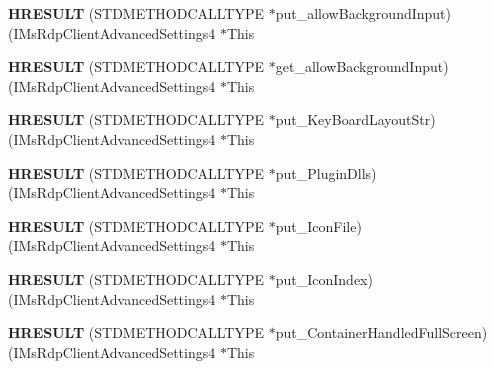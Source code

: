 \begin{DoxyCompactItemize}
{\bfseries H\+R\+E\+S\+U\+LT} (S\+T\+D\+M\+E\+T\+H\+O\+D\+C\+A\+L\+L\+T\+Y\+PE $\ast$put\+\_\+allow\+Background\+Input)(I\+Ms\+Rdp\+Client\+Advanced\+Settings4 $\ast$This
\item 
\mbox{\label{struct_i_ms_rdp_client_advanced_settings4_vtbl_a2c66b4247e19739960fdf21e71386032}} 
{\bfseries H\+R\+E\+S\+U\+LT} (S\+T\+D\+M\+E\+T\+H\+O\+D\+C\+A\+L\+L\+T\+Y\+PE $\ast$get\+\_\+allow\+Background\+Input)(I\+Ms\+Rdp\+Client\+Advanced\+Settings4 $\ast$This
\item 
\mbox{\label{struct_i_ms_rdp_client_advanced_settings4_vtbl_a652a597b01b19d641fea689fe9eb5aac}} 
{\bfseries H\+R\+E\+S\+U\+LT} (S\+T\+D\+M\+E\+T\+H\+O\+D\+C\+A\+L\+L\+T\+Y\+PE $\ast$put\+\_\+\+Key\+Board\+Layout\+Str)(I\+Ms\+Rdp\+Client\+Advanced\+Settings4 $\ast$This
\item 
\mbox{\label{struct_i_ms_rdp_client_advanced_settings4_vtbl_a276d61d99569315e158535b6f018b48c}} 
{\bfseries H\+R\+E\+S\+U\+LT} (S\+T\+D\+M\+E\+T\+H\+O\+D\+C\+A\+L\+L\+T\+Y\+PE $\ast$put\+\_\+\+Plugin\+Dlls)(I\+Ms\+Rdp\+Client\+Advanced\+Settings4 $\ast$This
\item 
\mbox{\label{struct_i_ms_rdp_client_advanced_settings4_vtbl_a5eb12e04d7897bce27b7065a282681a9}} 
{\bfseries H\+R\+E\+S\+U\+LT} (S\+T\+D\+M\+E\+T\+H\+O\+D\+C\+A\+L\+L\+T\+Y\+PE $\ast$put\+\_\+\+Icon\+File)(I\+Ms\+Rdp\+Client\+Advanced\+Settings4 $\ast$This
\item 
\mbox{\label{struct_i_ms_rdp_client_advanced_settings4_vtbl_a0530a479c03429c9dd4565556e5a8c3f}} 
{\bfseries H\+R\+E\+S\+U\+LT} (S\+T\+D\+M\+E\+T\+H\+O\+D\+C\+A\+L\+L\+T\+Y\+PE $\ast$put\+\_\+\+Icon\+Index)(I\+Ms\+Rdp\+Client\+Advanced\+Settings4 $\ast$This
\item 
\mbox{\label{struct_i_ms_rdp_client_advanced_settings4_vtbl_a3793d0c91ddbf132879e1a882ca0a6fe}} 
{\bfseries H\+R\+E\+S\+U\+LT} (S\+T\+D\+M\+E\+T\+H\+O\+D\+C\+A\+L\+L\+T\+Y\+PE $\ast$put\+\_\+\+Container\+Handled\+Full\+Screen)(I\+Ms\+Rdp\+Client\+Advanced\+Settings4 $\ast$This

\end{DoxyCompactItemize}
